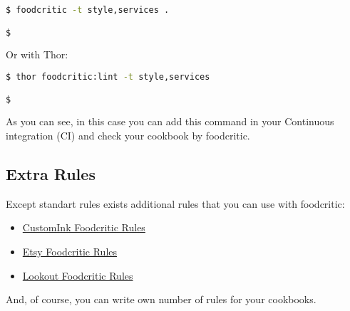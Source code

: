 \begin{lstlisting}[language=Bash,label=lst:testing-thor8]
$ foodcritic -t style,services .

$
\end{lstlisting}

Or with Thor:

\begin{lstlisting}[language=Bash,label=lst:testing-thor9]
$ thor foodcritic:lint -t style,services

$
\end{lstlisting}

As you can see, in this case you can add this command in your Continuous integration (CI) and check your cookbook by foodcritic.

\subsection{Extra Rules}

Except standart rules exists additional rules that you can use with foodcritic:

\begin{itemize}
  \item \href{https://github.com/customink-webops/foodcritic-rules}{CustomInk Foodcritic Rules}
  \item \href{https://github.com/etsy/foodcritic-rules}{Etsy Foodcritic Rules}
  \item \href{https://github.com/lookout/lookout-foodcritic-rules}{Lookout Foodcritic Rules}
\end{itemize}

And, of course, you can write own number of rules for your cookbooks.